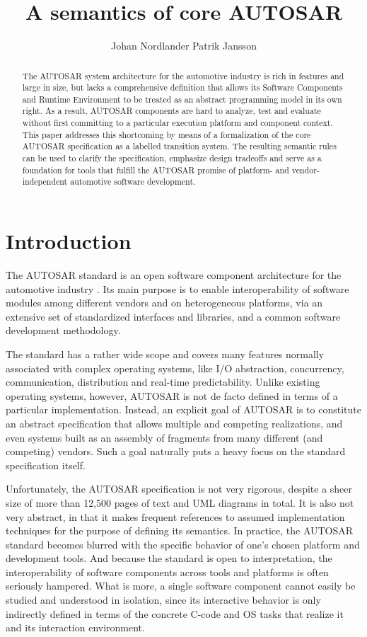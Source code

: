 \documentclass[10pt,conference]{IEEEtran}
\title{A semantics of core AUTOSAR}
\author{Johan Nordlander \quad\quad Patrik Jansson}
\affil{Department of Computer Science and Engineering, Chalmers University of Technology}
\begin{document}
\maketitle
\begin{abstract}
The AUTOSAR system architecture for the automotive industry is rich in features and large in size, but lacks a comprehensive definition that allows its Software Components and Runtime Environment to be treated as an abstract programming model in its own right. As a result, AUTOSAR components are hard to analyze, test and evaluate without first committing to a particular execution platform and component context. This paper addresses this shortcoming by means of a formalization of the core AUTOSAR specification as a labelled transition system. The resulting semantic rules can be used to clarify the specification, emphasize design tradeoffs and serve as a foundation for tools that fulfill the AUTOSAR promise of platform- and vendor-independent automotive software development.
\end{abstract}

\section{Introduction}
\label{sec:Intro}

The AUTOSAR standard is an open software component architecture for the automotive industry \cite{AR:Homepage}. Its main purpose is to enable interoperability of software modules among different vendors and on heterogeneous platforms, via an extensive set of standardized interfaces and libraries, and a common software development methodology.

The standard has a rather wide scope and covers many features normally associated with complex operating systems, like I/O abstraction, concurrency, communication, distribution and real-time predictability. Unlike existing operating systems, however, AUTOSAR is not de facto defined in terms of a particular implementation. Instead, an explicit goal of AUTOSAR is to constitute an abstract specification that allows multiple and competing realizations, and even systems built as an assembly of fragments from many different (and competing) vendors. Such a goal naturally puts a heavy focus on the standard specification itself.

Unfortunately, the AUTOSAR specification is not very rigorous, despite a sheer size of more than 12,500 pages of text and UML diagrams in total. It is also not very abstract, in that it makes frequent references to assumed implementation techniques for the purpose of defining its semantics. In practice, the AUTOSAR standard becomes blurred with the specific behavior of one's chosen platform and development tools. And because the standard is open to interpretation, the interoperability of software components across tools and platforms is often seriously hampered. What is more, a single software component cannot easily be studied and understood in isolation, since its interactive behavior is only indirectly defined in terms of the concrete C-code and OS tasks that realize it and its interaction environment.
\end{document}
